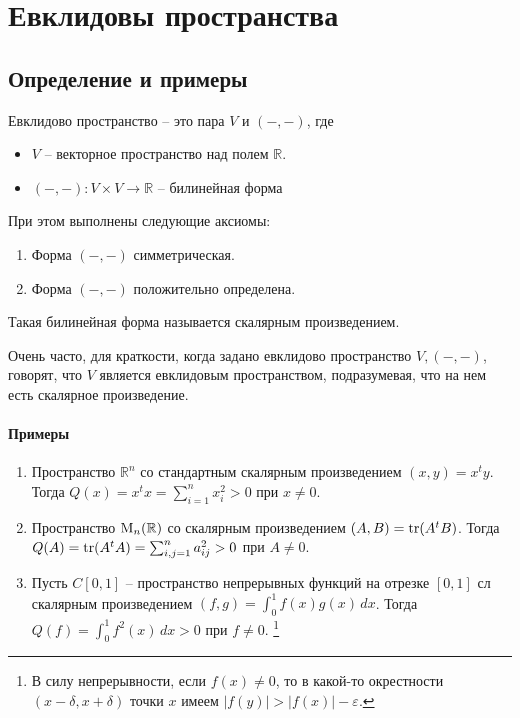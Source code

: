 \newpage
\section{Евклидовы пространства}

\subsection{Определение и примеры}

\begin{definition}
Евклидово пространство -- это пара $V$ и $({-},{-})$, где 
\begin{itemize}
\item $V$ -- векторное пространство над полем $\mathbb R$.

\item $({-},{-})\colon V\times V\to \mathbb R$ -- билинейная форма
\end{itemize}
При этом выполнены следующие аксиомы:
\begin{enumerate}
\item Форма $({-},{-})$ симметрическая.

\item Форма $({-},{-})$ положительно определена.
\end{enumerate}
Такая билинейная форма называется скалярным произведением.
\end{definition}

Очень часто, для краткости, когда задано евклидово пространство $V, ({-},{-})$, говорят, что $V$ является евклидовым пространством, подразумевая, что на нем есть скалярное произведение.

\paragraph{Примеры}

\begin{enumerate}
\item Пространство $\mathbb R^n$ со стандартным скалярным произведением $(x,y) = x^t y$.
Тогда $Q(x) = x^t x = \sum_{i=1}^n x_i^2 > 0$ при $x\neq 0$.

\item Пространство $\operatorname{M}_{n}(\mathbb R)$ со скалярным произведением $(A, B) = \operatorname{tr}(A^t B)$.
Тогда $Q(A) = \operatorname{tr}(A^t A) = \sum_{i,j=1}^n a_{ij}^2 > 0$ при $A\neq 0$.

\item Пусть $C[0,1]$ -- пространство непрерывных функций на отрезке $[0,1]$ сл скалярным произведением $(f,g) = \int_0^1 f(x) g(x)\,dx$.
Тогда $Q(f) = \int_0^1 f^2(x)\,dx > 0$ при $f \neq 0$.%
\footnote{В силу непрерывности, если $f(x)\neq 0$, то в какой-то окрестности $(x-\delta, x+\delta)$ точки $x$ имеем $|f(y)| > |f(x)| - \varepsilon$.}
\end{enumerate}

